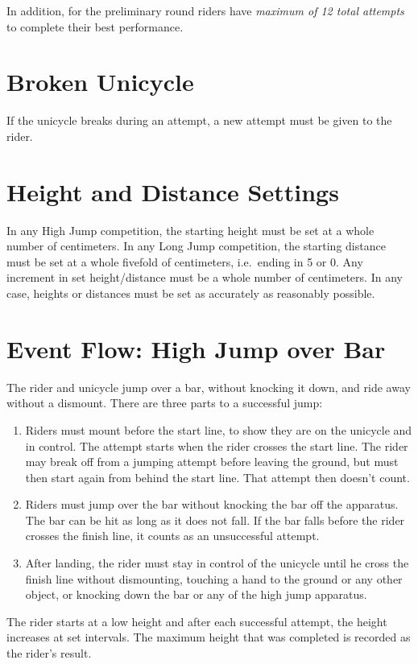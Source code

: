 In addition, for the preliminary round riders have \textit{maximum of 12 total attempts} to complete their best performance.

\section{Broken Unicycle}
If the unicycle breaks during an attempt, a new attempt must be given to the rider.

\section{Height and Distance Settings}

In any High Jump competition, the starting height must be set at a whole number of centimeters.
In any Long Jump competition, the starting distance must be set at a whole fivefold of centimeters, i.e.\ ending in 5 or 0.
Any increment in set height/distance must be a whole number of centimeters.
In any case, heights or distances must be set as accurately as reasonably possible.

\section{Event Flow: High Jump over Bar}
The rider and unicycle jump over a bar, without knocking it down, and ride away without a dismount.
There are three parts to a successful jump:
\begin{enumerate}
\item Riders must mount before the start line, to show they are on the unicycle and in control.
The attempt starts when the rider crosses the start line.
The rider may break off from a jumping attempt before leaving the ground, but must then start again from behind the start line.
That attempt then doesn't count.
\item Riders must jump over the bar without knocking the bar off the apparatus.
The bar can be hit as long as it does not fall.
If the bar falls before the rider crosses the finish line, it counts as an unsuccessful attempt.
\item After landing, the rider must stay in control of the unicycle until he cross the finish line without dismounting, touching a hand to the ground or any other object, or knocking down the bar or any of the high jump apparatus.
\end{enumerate}
The rider starts at a low height and after each successful attempt, the height increases at set intervals.
The maximum height that was completed is recorded as the rider's result.

